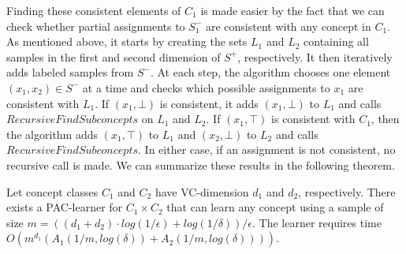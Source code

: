 Finding these consistent elements of $C_1$ is made easier by the fact that we can check whether partial assignments to $S^-_1$ are consistent with any concept in $C_1$. 
As mentioned above, it starts by creating the sets $L_1$ and $L_2$ containing all samples in the first and second dimension of $S^+$, respectively.
It then iteratively adds labeled samples from $S^-$.
At each step, the algorithm chooses one element $(x_1, x_2) \in S^-$ at a time and checks which possible assignments to $x_1$ are consistent with $L_1$.
If $(x_1, \bot)$ is consistent, it adds $(x_1, \bot)$ to $L_1$ and calls $RecursiveFindSubconcepts$ on $L_1$ and $L_2$.
If $(x_1, \top)$ is consistent with $C_1$, then the algorithm adds $(x_1, \top)$ to $L_1$ and $(x_2, \bot)$ to $L_2$ and calls $RecursiveFindSubconcepts$.
In either case, if an assignment is not consistent, no recursive call is made. 
We can summarize these results in the following theorem.




\begin{theorem}
Let concept classes $C_1$ and $C_2$ have VC-dimension $d_1$ and $d_2$, respectively.
There exists a PAC-learner for $C_1 \times C_2$ that can learn any concept using a sample of size $m = ((d_1 + d_2) \cdot log(1/\epsilon) + log(1/\delta))/\epsilon$.
The learner requires time $O(m^{d_1}(A_1(1/m, log(\delta)) +  A_2(1/m, log(\delta))))$.
\end{theorem}






